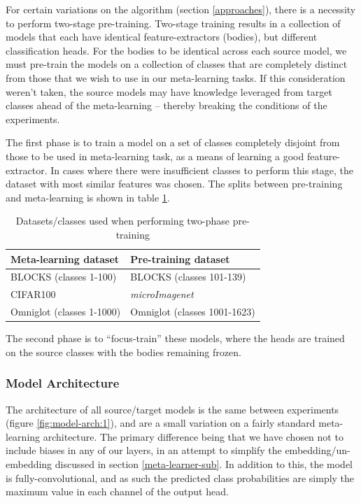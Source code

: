 \documentclass{report}
\begin{document}
For certain variations on the algorithm (section \ref{approaches}), there is a necessity to perform two-stage pre-training. Two-stage training results in a collection of models that each have identical feature-extractors (bodies), but different classification heads. For the bodies to be identical across each source model, we must pre-train the models on a collection of classes that are completely distinct from those that we wish to use in our meta-learning tasks. If this consideration weren't taken, the source models may have knowledge leveraged from target classes ahead of the meta-learning -- thereby breaking the conditions of the experiments. \par
The first phase is to train a model on a set of classes completely disjoint from those to be used in meta-learning task, as a means of learning a good feature-extractor. In cases where there were insufficient classes to perform this stage, the dataset with most similar features was chosen. The splits between pre-training and meta-learning is shown in table \ref{tab:pre-train}. \par
\begin{table}[h!] \label{tab:pre-train}
	\centering
	\begin{tabular}{|l|l|}
		\hline
		\textbf{Meta-learning dataset} & \textbf{Pre-training dataset} \\ \hline
		BLOCKS (classes 1-100)         & BLOCKS (classes 101-139)      \\ \hline
		CIFAR100                       & \textit{microImagenet}        \\ \hline
		Omniglot (classes 1-1000)      & Omniglot (classes 1001-1623)  \\ \hline
	\end{tabular}
	\caption{Datasets/classes used when performing two-phase pre-training}
\end{table}
The second phase is to ``focus-train'' these models, where the heads are trained on the source classes with the bodies remaining frozen.


\subsubsection{Model Architecture}
The architecture of all source/target models is the same between experiments (figure \ref{fig:model-arch:1}), and are a small variation on a fairly standard meta-learning architecture. The primary difference being that we have chosen not to include biases in any of our layers, in an attempt to simplify the embedding/un-embedding discussed in section \ref{meta-learner-sub}. In addition to this, the model is fully-convolutional, and as such the predicted class probabilities are simply the maximum value in each channel of the output head.
\end{document}
